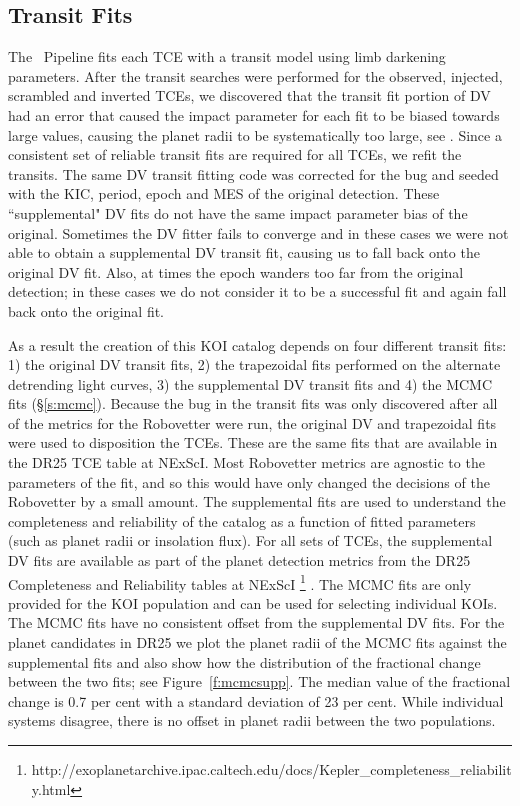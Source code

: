 \subsection{Transit Fits}

The \Kepler\ Pipeline fits each TCE with a \citet{Mandel2002} transit model using \citet{Claret2000} limb darkening parameters. After the transit searches were performed for the observed, injected, scrambled and inverted TCEs, we discovered that the transit fit portion of DV had an error that caused the impact parameter for each fit to be biased towards large values, causing the planet radii to be systematically too large, see \citet{KSCI19110}. Since a consistent set of reliable transit fits are required for all TCEs, we refit the transits.  The same DV transit fitting code was corrected for the bug and seeded with the KIC, period, epoch and MES of the original detection. These ``supplemental" DV fits do not have the same impact parameter bias of the original.  Sometimes the DV fitter fails to converge and in these cases we were not able to obtain a supplemental DV transit fit, causing us to fall back onto the original DV fit. Also, at times the epoch wanders too far from the original detection; in these cases we do not consider it to be a successful fit and again fall back onto the original fit.

As a result the creation of this KOI catalog depends on four different transit fits: 1) the original DV transit fits, 2) the trapezoidal fits performed on the alternate detrending light curves, 3) the supplemental DV transit fits and 4) the MCMC fits (\S\ref{s:mcmc}).  Because the bug in the transit fits was only discovered after all of the metrics for the Robovetter were run, the original DV and trapezoidal fits were used to disposition the TCEs. These are the same fits that are available in the DR25 TCE table at NExScI.  Most Robovetter metrics are agnostic to the parameters of the fit, and so this would have only changed the decisions of the Robovetter by a small amount.  The supplemental fits are used to understand the completeness and reliability of the catalog as a function of fitted parameters (such as planet radii or insolation flux).  For all sets of TCEs, the supplemental DV fits are available as part of the planet detection metrics from the DR25 Completeness and Reliability tables at NExScI \footnote{http://exoplanetarchive.ipac.caltech.edu/docs/Kepler\_completeness\_reliability.html}  \citep{KSCI19110,KSCI19114}. The MCMC fits are only provided for the KOI population and can be used for selecting individual KOIs. The MCMC fits have no consistent offset from the supplemental DV fits.  For the planet candidates in DR25 we plot the planet radii of the MCMC fits against the supplemental fits and also show how the distribution of the fractional change between the two fits; see Figure~\ref{f:mcmcsupp}. The median value of the fractional change is 0.7 per cent with a standard deviation of 23 per cent. While individual systems disagree, there is no offset in planet radii between the two populations.  

